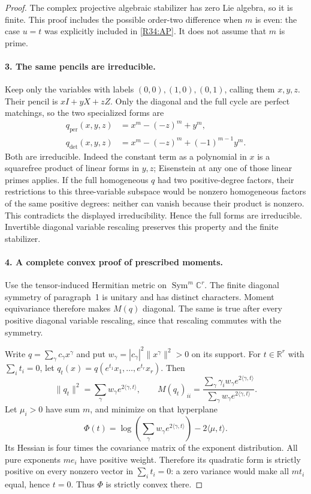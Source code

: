 \begin{proof}
The complex projective algebraic stabilizer has zero Lie
algebra, so it is finite. This proof includes the possible
order-two difference when $m$ is even: the case $u=t$ was
explicitly included in \eqref{R34:AP}. It does not assume
that $m$ is prime.

\paragraph{3. The same pencils are irreducible.}
Keep only the variables with labels $(0,0),(1,0),(0,1)$,
calling them $x,y,z$. Their pencil is $xI+yX+zZ$.
Only the diagonal and the full cycle are perfect matchings,
so the two specialized forms are
\[
 \begin{aligned}
 q_{\mathrm{per}}(x,y,z)&=x^m-(-z)^m+y^m,\\
 q_{\det}(x,y,z)&=x^m-(-z)^m+(-1)^{m-1}y^m.
 \end{aligned}
\]
Both are irreducible. Indeed the constant term as a polynomial
in $x$ is a squarefree product of linear forms in $y,z$;
Eisenstein at any one of those linear primes applies.
If the full homogeneous $q$ had two positive-degree factors,
their restrictions to this three-variable subspace would be
nonzero homogeneous factors of the same positive degrees:
neither can vanish because their product is nonzero.
This contradicts the displayed irreducibility. Hence the
full forms are irreducible. Invertible diagonal variable
rescaling preserves this property and the finite stabilizer.

\paragraph{4. A complete convex proof of prescribed moments.}
Use the tensor-induced Hermitian metric on
$\operatorname{Sym}^m\mathbb C^r$. The finite diagonal
symmetry of paragraph~1 is unitary and has distinct characters.
Moment equivariance therefore makes $M(q)$ diagonal. The same
is true after every positive diagonal variable rescaling,
since that rescaling commutes with the symmetry.

Write $q=\sum_\gamma c_\gamma x^\gamma$ and put
$w_\gamma=|c_\gamma|^2\|x^\gamma\|^2>0$ on its support.
For $t\in\mathbb R^r$ with $\sum_i t_i=0$, let
$q_t(x)=q(e^{t_1}x_1,\ldots,e^{t_r}x_r)$. Then
\[
 \|q_t\|^2=\sum_\gamma w_\gamma e^{2\langle\gamma,t\rangle},
 \qquad
 M(q_t)_{ii}
   =\frac{\sum_\gamma\gamma_iw_\gamma
                    e^{2\langle\gamma,t\rangle}}
          {\sum_\gamma w_\gamma e^{2\langle\gamma,t\rangle}}.
\]
Let $\mu_i>0$ have sum $m$, and minimize on that hyperplane
\begin{equation}\label{R34:convex}
 \Phi(t)=\log\!\left(\sum_\gamma w_\gamma
                         e^{2\langle\gamma,t\rangle}\right)
                                      -2\langle\mu,t\rangle.
\end{equation}
Its Hessian is four times the covariance matrix of the
exponent distribution. All pure exponents $m e_i$ have
positive weight. Therefore its quadratic form is strictly
positive on every nonzero vector in $\sum_i t_i=0$:
a zero variance would make all $m t_i$ equal, hence $t=0$.
Thus $\Phi$ is strictly convex there.


\end{proof}
